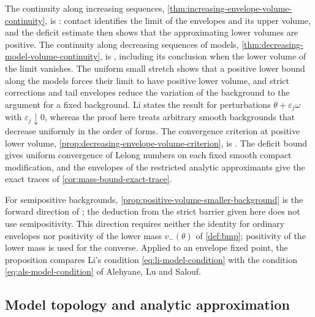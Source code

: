 The continuity along increasing sequences, \cref{thm:increasing-envelope-volume-continuity}, is \cite[v1, Proposition 3.5(i)]{XL26}: contact identifies the limit of the envelopes and its upper volume, and the deficit estimate then shows that the approximating lower volumes are positive. The continuity along decreasing sequences of models, \cref{thm:decreasing-model-volume-continuity}, is \cite[v1, Proposition 3.5(ii)]{XL26}, including its conclusion when the lower volume of the limit vanishes. The uniform small stretch shows that a positive lower bound along the models forces their limit to have positive lower volume, and strict corrections and tail envelopes reduce the variation of the background to the argument for a fixed background. Li states the result for perturbations $\theta+\varepsilon_j\omega$ with $\varepsilon_j\downarrow0$, whereas the proof here treats arbitrary smooth backgrounds that decrease uniformly in the order of forms. The convergence criterion at positive lower volume, \cref{prop:decreasing-envelope-volume-criterion}, is \cite[v1, Proposition 3.5(iii)]{XL26}. The deficit bound gives uniform convergence of Lelong numbers on each fixed smooth compact modification, and the envelopes of the restricted analytic approximants give the exact traces of \cref{cor:mass-bound-exact-trace}.

For semipositive backgrounds, \cref{prop:positive-volume-smaller-background} is the forward direction of \cite[Proposition~2.12, pp.~13--14]{ALS26}; the deduction from the strict barrier given here does not use semipositivity. This direction requires neither the identity for ordinary envelopes nor positivity of the lower mass $v_-(\theta)$ of \cref{def:bmp}; positivity of the lower mass is used for the converse. Applied to an envelope fixed point, the proposition compares Li's condition \eqref{eq:li-model-condition} with the condition \eqref{eq:als-model-condition} of Alehyane, Lu and Salouf.

\subsection{Model topology and analytic approximation}

